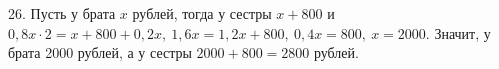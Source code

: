 26. Пусть у брата $x$ рублей, тогда у сестры $x+800$ и $0,8x\cdot2=x+800+0,2x,\ 1,6x=1,2x+800,\ 0,4x=800,\ x=2000.$ Значит, у брата 2000 рублей, а у сестры $2000+800=2800$ рублей.\\
